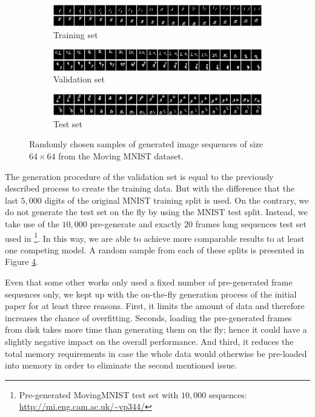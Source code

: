 \begin{figure}[htpb]
\centering
\begin{subfigure}{1.0\textwidth}
  \centering
  \includegraphics[width=1.0\linewidth]{figures/ds/mm_train.png}
  \caption{Training set}
  \label{fig:mm_train}
  \vspace{.1cm}
\end{subfigure}
\begin{subfigure}{1.0\textwidth}
  \centering
  \includegraphics[width=1.0\linewidth]{figures/ds/mm_valid.png}
  \caption{Validation set}
  \label{fig:mm_valid}
  \vspace{.1cm}
\end{subfigure}
\begin{subfigure}{1.0\textwidth}
  \centering
  \includegraphics[width=1.0\linewidth]{figures/ds/mm_test.png}
  \caption{Test set}
  \label{fig:mm_test}
\end{subfigure}
\caption[MovingMNIST Image Sequence Samples]{Randomly chosen samples of generated image sequences of size $64 \times 64$ from the Moving MNIST dataset.}
\label{fig:moving_mnist}
\end{figure}

The generation procedure of the validation set is equal to the previously described process to create the training data. But with the difference that the last $5,000$ digits of the original MNIST training split is used. On the contrary, we do not generate the test set on the fly by using the MNIST test split. Instead, we take use of the $10,000$ pre-generate and exactly $20$ frames long sequences test set used in \parencite{spat_temp_video_autoenc}\footnote{Pre-generated MovingMNIST test set with $10,000$ sequences: \url{http://mi.eng.cam.ac.uk/~vp344/}}. In this way, we are able to achieve more comparable results to at least one competing model. A random sample from each of these splits is presented in Figure \ref{fig:moving_mnist}.

Even that some other works only used a fixed number of pre-generated frame sequences only, we kept up with the on-the-fly generation process of the initial paper for at least three reasons. First, it limits the amount of data and therefore increases the chance of overfitting. Seconds, loading the pre-generated frames from disk takes more time than generating them on the fly; hence it could have a slightly negative impact on the overall performance. And third, it reduces the total memory requirements in case the whole data would otherwise be pre-loaded into memory in order to eliminate the second mentioned issue.

